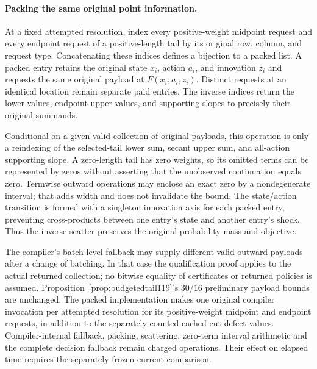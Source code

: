 \paragraph{Packing the same original point information.}
\label{rem:fusedtail119}
At a fixed attempted resolution, index every positive-weight midpoint
request and every endpoint request of a positive-length tail by its
original row, column, and request type.  Concatenating these indices
defines a bijection to a packed list.  A packed entry retains the
original state $x_i$, action $a_i$, and innovation $z_i$ and requests
the same original payload at $F(x_i,a_i,z_i)$.  Distinct requests at
an identical location remain separate paid entries.  The inverse
indices return the lower values, endpoint upper values, and supporting
slopes to precisely their original summands.

Conditional on a given valid collection of original payloads, this
operation is only a reindexing of the selected-tail lower sum, secant
upper sum, and all-action supporting slope.  A zero-length tail has
zero weights, so its omitted terms can be represented by zeros without
asserting that the unobserved continuation equals zero.  Termwise
outward operations may enclose an exact zero by a nondegenerate
interval; that adds width and does not invalidate the bound.
The state/action transition is formed with a singleton innovation
axis for each packed entry, preventing cross-products between one
entry's state and another entry's shock.  Thus the inverse scatter
preserves the original probability mass and objective.

The compiler's batch-level fallback may supply different valid
outward payloads after a change of batching.  In that case the
qualification proof applies to the actual returned collection; no
bitwise equality of certificates or returned policies is assumed.
Proposition~\ref{prop:budgetedtail119}'s $30/16$ preliminary payload
bounds are unchanged.  The packed implementation makes one original
compiler invocation per attempted resolution for its positive-weight
midpoint and endpoint requests, in addition to the separately counted
cached cut-defect values.  Compiler-internal fallback, packing,
scattering, zero-term interval arithmetic and the complete decision
fallback remain charged operations.  Their effect on elapsed time
requires the separately frozen current comparison.
